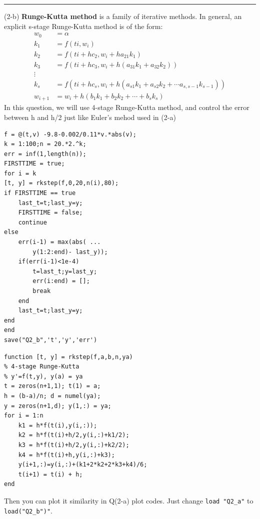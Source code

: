 \documentclass{article}
\begin{document}
\begin{flushleft}
\begin{enumerate}
\begin{framed}
\newpage
\rule[-0.7mm]{45em}{0.5pt}
(2-b)
\newline
\textbf{Runge-Kutta method} is a family of iterative methods.
In general, an explicit s-stage Runge-Kutta method is of the form:
\begin{align*} 
  w_{0} &= \alpha\\
  k_{1} &= f(t{i},w_{i})\\
  k_{2} &= f(t{i}+hc_{2},w_{i}+ha_{21}k_{1})\\
  k_{3} &= f(t{i}+hc_{3},w_{i}+h(a_{31}k_{1}+a_{32}k_{2}))\\
  \vdots\\
  k_{s} &= f(t{i}+hc_{s},w_{i}+h(a_{s1}k_{1}+a_{s2}k_{2}+\cdots a_{s,s-1}k_{s-1}))\\
  w_{i+1}&=w_{i}+h(b_1k_1+b_2k_2+\cdots +b_sk_s)
\end{align*}
In this question, we will use 4-stage Runge-Kutta method, and control the error between h and h/2 just like Euler's mehod used in (2-a)
\begin{multicols}{2}
\begin{verbatim}
f = @(t,v) -9.8-0.002/0.11*v.*abs(v);
k = 1:100;n = 20.*2.^k;
err = inf(1,length(n));
FIRSTTIME = true;
for i = k
[t, y] = rkstep(f,0,20,n(i),80);
if FIRSTTIME == true
    last_t=t;last_y=y;
    FIRSTTIME = false;
    continue
else
    err(i-1) = max(abs( ...
        y(1:2:end)- last_y));
    if(err(i-1)<1e-4)
        t=last_t;y=last_y;
        err(i:end) = [];
        break
    end
    last_t=t;last_y=y;
end
end
save("Q2_b",'t','y','err')
\end{verbatim}
\columnbreak
\begin{verbatim}
function [t, y] = rkstep(f,a,b,n,ya)
% 4-stage Runge-Kutta 
% y'=f(t,y), y(a) = ya
t = zeros(n+1,1); t(1) = a; 
h = (b-a)/n; d = numel(ya);
y = zeros(n+1,d); y(1,:) = ya;
for i = 1:n
    k1 = h*f(t(i),y(i,:));
    k2 = h*f(t(i)+h/2,y(i,:)+k1/2);
    k3 = h*f(t(i)+h/2,y(i,:)+k2/2);
    k4 = h*f(t(i)+h,y(i,:)+k3);
    y(i+1,:)=y(i,:)+(k1+2*k2+2*k3+k4)/6;
    t(i+1) = t(i) + h;
end
\end{verbatim}
Then you can plot it similarity in Q(2-a) plot codes. Just change \verb|load "Q2_a"| to \verb|load("Q2_b")"|.
\end{multicols}
\begin{multicols}{2}

\end{multicols}
\end{framed}
\end{enumerate}
\end{flushleft}
\end{document}
